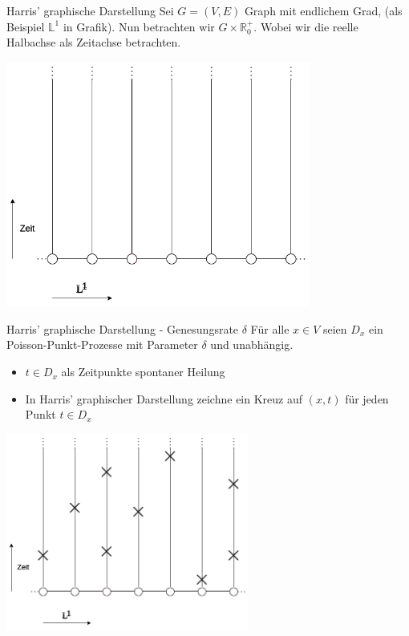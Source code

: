 \documentclass[11pt]{beamer}
\begin{document}
\begin{frame}{Harris' graphische Darstellung}
Sei $G = (V, E)$ Graph mit endlichem Grad, (als Beispiel $\mathbb{L}^1$  in Grafik). Nun betrachten wir $G \times \mathbb{R}^+_0$. Wobei wir die reelle Halbachse
als Zeitachse betrachten.
\begin{center}
    \includegraphics[width=0.75\textwidth]{images/contact process time.png}
\end{center}
\end{frame}

\begin{frame}{Harris' graphische Darstellung - Genesungsrate $\delta$}
    Für alle $x \in V$ seien $D_x$ ein Poisson-Punkt-Prozesse mit Parameter $\delta$ und unabhängig.
    \begin{itemize}
        \item $t \in D_x$ als Zeitpunkte spontaner Heilung
        \item In Harris' graphischer Darstellung zeichne ein Kreuz auf $(x, t)$ für jeden Punkt
            $t \in D_x$
    \end{itemize}
    \begin{center}
        \includegraphics[width=0.6\textwidth]{images/contact process crosses.png}
    \end{center}
\end{frame}
\end{document}
